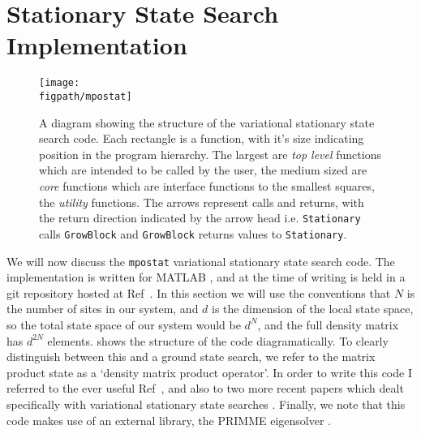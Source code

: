  
\FloatBarrier 
 
 \section{Stationary State Search Implementation}
 
 \begin{figure}[ht!]
 \centering
 \texttt{[image: \\figpath/mpostat]}
 \caption{A diagram showing the structure of the variational stationary state search code. Each rectangle is a function, with it's size indicating position in the program hierarchy. The largest are \emph{top level} functions which are intended to be called by the user, the medium sized are \emph{core} functions which are interface functions to the smallest squares, the \emph{utility} functions. The arrows represent calls and returns, with the return direction indicated by the arrow head i.e. \lstinline$Stationary$ calls \lstinline$GrowBlock$ and \lstinline$GrowBlock$ returns values to \lstinline$Stationary$. }
 \label{fig:vs2-2}
 \end{figure} 
 
 We will now discuss the \lstinline$mpostat$ variational stationary state search code. The implementation is written for MATLAB \cite{MATLAB}, and at the time of writing is held in a git repository hosted at Ref~\cite{otb:gitVSSS}. In this section we will use the conventions that \(N\) is the number of sites in our system, and \(d\) is the dimension of the local state space, so the total state space of our system would be \(d^{N}\), and the full density matrix has \(d^{2N}\) elements.  shows the structure of the code diagramatically. To clearly distinguish between this and a ground state search, we refer to the matrix product state as a `density matrix product operator'. In order to write this code I referred to the ever useful Ref~\cite{Schollwoeck11}, and also to two more recent papers which dealt specifically with variational stationary state searches \cite{CCB15,MFS15}. Finally, we note that this code makes use of an external library, the PRIMME eigensolver \cite{SM10,WRS16}.
 
